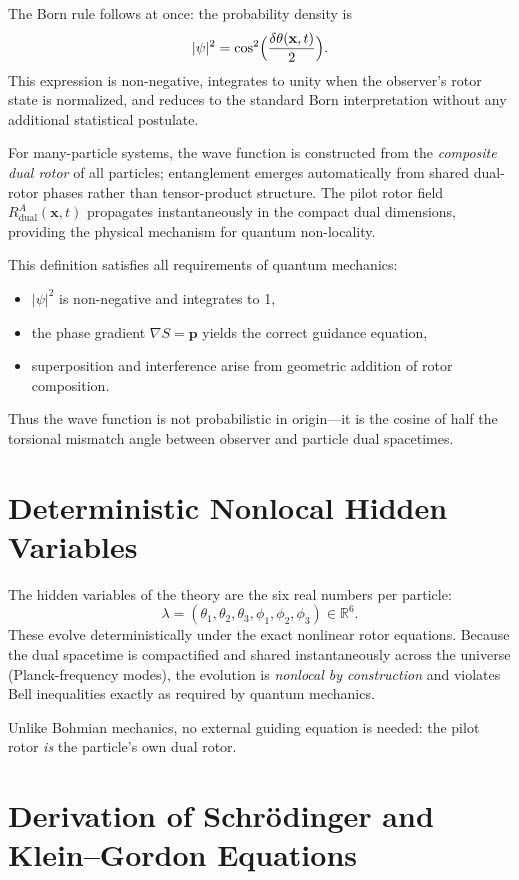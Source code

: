 \documentclass[dvipdfmx,a4paper]{article}
\begin{document}
The Born rule follows at once: the probability density is
\[
|\psi|^2 = \cos^2\Bigl(\frac{\delta\theta(\mathbf{x},t)}{2}\Bigr).
\]
This expression is non-negative, integrates to unity when the observer’s rotor state is normalized, and reduces to the standard Born interpretation without any additional statistical postulate.

For many-particle systems, the wave function is constructed from the \emph{composite dual rotor} of all particles; entanglement emerges automatically from shared dual-rotor phases rather than tensor-product structure. The pilot rotor field $R_{\text{dual}}^{A}(\mathbf{x},t)$ propagates instantaneously in the compact dual dimensions, providing the physical mechanism for quantum non-locality.

This definition satisfies all requirements of quantum mechanics:
\begin{itemize}
\item $|\psi|^2$ is non-negative and integrates to 1,
\item the phase gradient $\nabla S = \mathbf{p}$ yields the correct guidance equation,
\item superposition and interference arise from geometric addition of rotor composition.
\end{itemize}

Thus the wave function is not probabilistic in origin—it is the cosine of half the torsional mismatch angle between observer and particle dual spacetimes.

\section{Deterministic Nonlocal Hidden Variables}

The hidden variables of the theory are the six real numbers per particle:
\[
\lambda = (\theta_1,\theta_2,\theta_3, \phi_1,\phi_2,\phi_3) \in \mathbb{R}^6.
\]
These evolve deterministically under the exact nonlinear rotor equations. Because the dual spacetime is compactified and shared instantaneously across the universe (Planck-frequency modes), the evolution is \emph{nonlocal by construction} and violates Bell inequalities exactly as required by quantum mechanics.

Unlike Bohmian mechanics, no external guiding equation is needed: the pilot rotor \emph{is} the particle’s own dual rotor.

\section{Derivation of Schrödinger and Klein–Gordon Equations}
\end{document}
